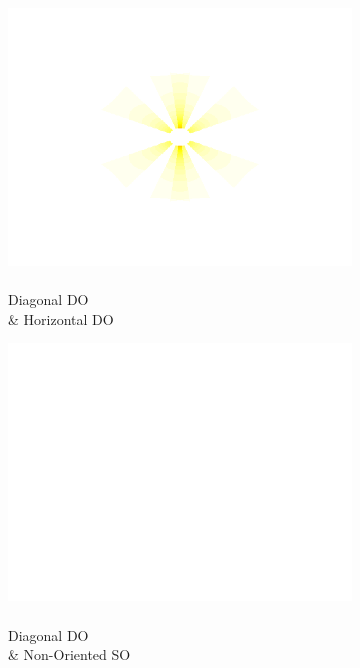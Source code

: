\documentclass[journal,onecolumn]{IEEEtran}
\begin{document}
\begin{figure}[h]
\begin{subfigure}[b]{0.2\textwidth}
            \includegraphics[width=.85\linewidth]{map-w_2_3}
            \caption{\\ Diagonal DO \\ \& Horizontal DO}
    \end{subfigure}%
    \begin{subfigure}[b]{0.2\textwidth}
            \centering
            \captionsetup{justification=centering}
            \includegraphics[width=.85\linewidth]{map-w_blank}
            \caption{\\ Diagonal DO \\ \& Non-Oriented SO}
    \end{subfigure}%
    \par \bigskip
    \begin{subfigure}[b]{0.2\textwidth}
            \centering
            \captionsetup{justification=centering}

\end{subfigure}
\end{figure}
\end{document}
